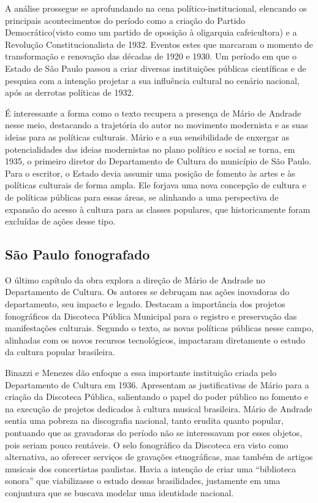 A análise prossegue se aprofundando na cena político-institucional,
elencando os principais acontecimentos do período como a criação do
Partido Democrático(visto como um partido de oposição à oligarquia
cafeicultora) e a Revolução Constitucionalista de 1932. Eventos estes
que marcaram o momento de transformação e renovação das décadas de 1920
e 1930. Um período em que o Estado de São Paulo passou a criar diversas
instituições públicas científicas e de pesquisa com a intenção projetar
a sua influência cultural no cenário nacional, após as derrotas
políticas de 1932.

É interessante a forma como o texto recupera a presença de Mário de
Andrade nesse meio, destacando a trajetória do autor no movimento
modernista e as suas ideias para as políticas culturais. Mário e a sua
sensibilidade de enxergar as potencialidades das ideias modernistas no
plano político e social se torna, em 1935, o primeiro diretor do
Departamento de Cultura do município de São Paulo. Para o escritor, o
Estado devia assumir uma posição de fomento às artes e às políticas
culturais de forma ampla. Ele forjava uma nova concepção de cultura e de
políticas públicas para essas áreas, se alinhando a uma perspectiva de
expansão do acesso à cultura para as classes populares, que
historicamente foram excluídas de ações desse tipo.

\subsection{São Paulo fonografado}

O último capítulo da obra explora a direção de Mário de Andrade no
Departamento de Cultura. Os autores se debruçam nas ações inovadoras do
departamento, seu impacto e legado. Destacam a importância dos projetos
fonográficos da Discoteca Pública Municipal para o registro e
preservação das manifestações culturais. Segundo o texto, as novas
políticas públicas nesse campo, alinhadas com os novos recursos
tecnológicos, impactaram diretamente o estudo da cultura popular
brasileira.

Binazzi e Menezes dão enfoque a essa importante instituição criada pelo
Departamento de Cultura em 1936. Apresentam as justificativas de Mário
para a criação da Discoteca Pública, salientando o papel do poder
público no fomento e na execução de projetos dedicados à cultura musical
brasileira. Mário de Andrade sentia uma pobreza na discografia nacional,
tanto erudita quanto popular, pontuando que as gravadoras do período não
se interessavam por esses objetos, pois seriam pouco rentáveis. O selo
fonográfico da Discoteca era visto como alternativa, ao oferecer
serviços de gravações etnográficas, mas também de artigos musicais dos
concertistas paulistas. Havia a intenção de criar uma ``biblioteca
sonora'' que viabilizasse o estudo dessas brasilidades, justamente em
uma conjuntura que se buscava modelar uma identidade nacional.

